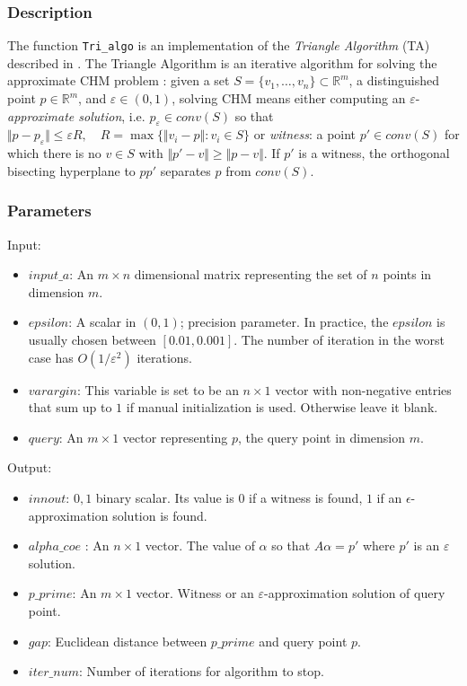 \documentclass[a4paper,12pt]{article}
\begin{document}
\subsubsection*{Description}
	The function \texttt{Tri\_algo} is an implementation of the {\it Triangle Algorithm} (TA)  described in \cite{kalantari2015characterization}. The Triangle Algorithm is an iterative algorithm for solving the approximate CHM problem : given a set $S=\{v_1, \dots, v_n\} \subset \mathbb{R}^m$, a distinguished point $p \in \mathbb{R} ^m$, and $\varepsilon \in (0,1)$, solving CHM means either computing an $\varepsilon$-{\it approximate solution}, i.e. $p_\varepsilon \in conv(S)$ so that  $\Vert p - p_\varepsilon \Vert  \leq \varepsilon R,  \quad R = \max \{\Vert v_i - p \Vert  : v_i \in S\}$ 	or {\it witness}: a point $p' \in conv(S)$ for which  there is no $v \in S$ with  $\Vert p' - v \Vert \geq \Vert p - v \Vert$. If $p'$ is a witness,
	the orthogonal bisecting hyperplane to $pp'$ separates $p$ from $conv(S)$. 

\subsubsection*{Parameters}


\noindent Input:
\begin{itemize}
	\item {$input\_a$:}
	An $m \times n$ dimensional matrix representing the set of $n$ points in dimension $m$.

	\item {$epsilon$:}
	A scalar in $(0,1)$; precision parameter. In practice, the $epsilon$ is usually chosen between $[0.01,0.001]$. The number of iteration in the worst case has $O(1/\varepsilon^2)$ iterations.
 	\item {$varargin$:}
	This variable is set to be an  $n\times 1$ vector with non-negative entries that sum up to $1$ if manual initialization is used.  Otherwise leave it blank.
	\item {$query$:}
	An $m\times 1$ vector representing $p$, the query point in dimension $m$.
\end{itemize}
Output:
\begin{itemize}
	\item {$innout$:}
	${0,1}$ binary scalar. Its value is $0$ if a witness is found, $1$ if an $\epsilon$-approximation solution is found.  
	\item {$alpha\_coe$ :}
	An $n\times 1$ vector. The value of $\alpha$ so that $A\alpha=p'$ where $p'$ is an $\varepsilon$ solution.
	\item {$p\_prime$:}
	An $m\times1$ vector. Witness or an $\varepsilon$-approximation solution  of query point.
	\item {$gap$:}
	Euclidean distance between $p\_prime$ and query point $p$.
	\item {$iter\_num$:}
	Number of iterations for algorithm to stop.
\end{itemize}
\end{document}
